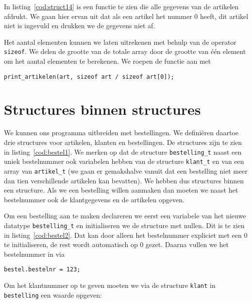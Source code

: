 In listing~\ref{cod:struct14} is een functie te zien die alle gegevens van de artikelen afdrukt. We gaan hier ervan uit dat als een artikel het nummer 0 heeft, dit artikel niet is ingevuld en drukken we de gegevens niet af. 


Het aantal elementen kunnen we laten uitrekenen met behulp van de operator \texttt{sizeof}. We delen de grootte van de totale array door de grootte van één element om het aantal elementen te berekenen.
We roepen de functie aan met

\hspace*{1em}\texttt{print\_artikelen(art, sizeof art / sizeof art[0]);}


\section{Structures binnen structures}
We kunnen ons programma uitbreiden met bestellingen. We definiëren daartoe drie structures voor artikelen, klanten en bestellingen. De structures zijn te zien in listing~\ref{cod:bestel1}. We merken op dat de structure \texttt{bestelling\_t} naast een uniek bestelnummer ook variabelen hebben van de structure \texttt{klant\_t} en van een array van \texttt{artikel\_t} (we gaan er gemakshalve vanuit dat een bestelling niet meer dan tien verschillende artikelen kan bevatten). We hebben dus structures binnen een structure. Als we een bestelling willen aanmaken dan moeten we naast het bestelnummer ook de klantgegevens en de artikelen opgeven.


Om een bestelling aan te maken declareren we eerst een variabele van het nieuwe datatype \texttt{bestelling\_t} en initialiseren we de structure met nullen. Dit is te zien in listing~\ref{cod:bestel2}. Dat kan door alleen het bestelnummer expliciet met een 0 te initialiseren, de rest wordt automatisch op 0 gezet. Daarna vullen we het bestelnummer in via

\hspace*{1em}\texttt{bestel.bestelnr = 123;}

Om het klantnummer op te geven moeten we via de structure \texttt{klant} in \texttt{bestelling} een waarde opgeven:

